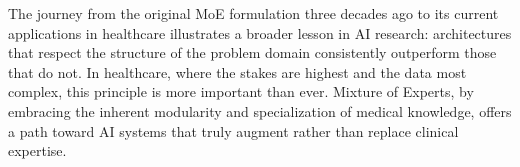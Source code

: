 The journey from the original MoE formulation three decades ago to its current applications in healthcare illustrates a broader lesson in AI research: architectures that respect the structure of the problem domain consistently outperform those that do not. In healthcare, where the stakes are highest and the data most complex, this principle is more important than ever. Mixture of Experts, by embracing the inherent modularity and specialization of medical knowledge, offers a path toward AI systems that truly augment rather than replace clinical expertise.

